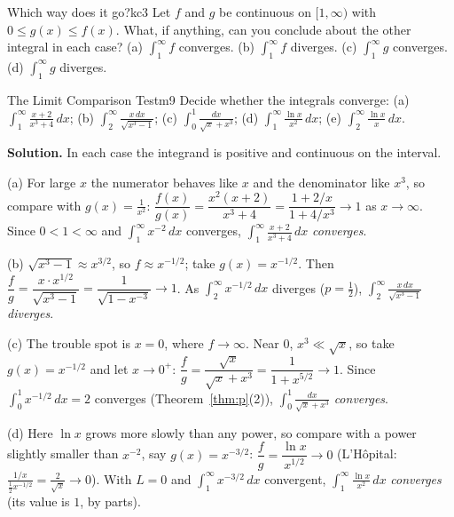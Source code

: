 \documentclass[11pt]{article}
\begin{document}
\begin{kc}{Which way does it go?}{kc3}
Let $f$ and $g$ be continuous on $[1,\infty)$ with $0\le g(x)\le f(x)$. What, if anything, can you conclude about the other integral in each case? (a) $\int_1^\infty f$ converges. (b) $\int_1^\infty f$ diverges. (c) $\int_1^\infty g$ converges. (d) $\int_1^\infty g$ diverges.
\end{kc}

\begin{exmp}{The Limit Comparison Test}{m9}
Decide whether the integrals converge: (a) $\displaystyle\int_1^\infty\frac{x+2}{x^3+4}\,dx$; (b) $\displaystyle\int_2^\infty\frac{x\,dx}{\sqrt{x^3-1}}$; (c) $\displaystyle\int_0^1\frac{dx}{\sqrt x+x^3}$; (d) $\displaystyle\int_1^\infty\frac{\ln x}{x^2}\,dx$; (e) $\displaystyle\int_2^\infty\frac{\ln x}x\,dx$.

\textbf{Solution.} In each case the integrand is positive and continuous on the interval.

(a) For large $x$ the numerator behaves like $x$ and the denominator like $x^3$, so compare with $g(x)=\frac1{x^2}$: $\dfrac{f(x)}{g(x)}=\dfrac{x^2(x+2)}{x^3+4}=\dfrac{1+2/x}{1+4/x^3}\to1$ as $x\to\infty$. Since $0<1<\infty$ and $\int_1^\infty x^{-2}\,dx$ converges, $\int_1^\infty\frac{x+2}{x^3+4}\,dx$ \emph{converges}.

(b) $\sqrt{x^3-1}\approx x^{3/2}$, so $f\approx x^{-1/2}$; take $g(x)=x^{-1/2}$. Then $\dfrac fg=\dfrac{x\cdot x^{1/2}}{\sqrt{x^3-1}}=\dfrac1{\sqrt{1-x^{-3}}}\to1$. As $\int_2^\infty x^{-1/2}\,dx$ diverges ($p=\frac12$), $\int_2^\infty\frac{x\,dx}{\sqrt{x^3-1}}$ \emph{diverges}.

(c) The trouble spot is $x=0$, where $f\to\infty$. Near $0$, $x^3\ll\sqrt x$, so take $g(x)=x^{-1/2}$ and let $x\to0^+$: $\dfrac fg=\dfrac{\sqrt x}{\sqrt x+x^3}=\dfrac1{1+x^{5/2}}\to1$. Since $\int_0^1x^{-1/2}\,dx=2$ converges (Theorem~\ref{thm:p}(2)), $\int_0^1\frac{dx}{\sqrt x+x^3}$ \emph{converges}.

(d) Here $\ln x$ grows more slowly than any power, so compare with a power slightly smaller than $x^{-2}$, say $g(x)=x^{-3/2}$: $\dfrac fg=\dfrac{\ln x}{x^{1/2}}\to0$ (L'Hôpital: $\frac{1/x}{\frac12x^{-1/2}}=\frac2{\sqrt x}\to0$). With $L=0$ and $\int_1^\infty x^{-3/2}\,dx$ convergent, $\int_1^\infty\frac{\ln x}{x^2}\,dx$ \emph{converges} (its value is $1$, by parts).


\end{exmp}
\end{document}
